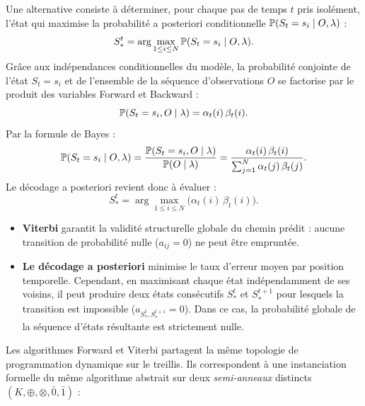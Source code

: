 \begin{proposition}
    Une alternative consiste à déterminer, pour chaque pas de temps $t$ pris isolément, l'état qui maximise la probabilité a posteriori conditionnelle $\mathbb{P}(S_t = s_i \mid O, \lambda)$ :
    \begin{equation}
        S_*^t = \arg\max_{1 \le i \le N} \mathbb{P}(S_t = s_i \mid O, \lambda).
    \end{equation}
    Grâce aux indépendances conditionnelles du modèle, la probabilité conjointe de l'état $S_t = s_i$ et de l'ensemble de la séquence d'observations $O$ se factorise par le produit des variables Forward et Backward :
    \begin{equation}
        \mathbb{P}(S_t = s_i, O \mid \lambda) = \alpha_t(i) \, \beta_t(i).
    \end{equation}
    Par la formule de Bayes :
    \begin{equation}
        \mathbb{P}(S_t = s_i \mid O, \lambda) = \frac{\mathbb{P}(S_t = s_i, O \mid \lambda)}{\mathbb{P}(O \mid \lambda)} = \frac{\alpha_t(i) \, \beta_t(i)}{\sum_{j=1}^N \alpha_t(j) \, \beta_t(j)}.
    \end{equation}
    Le décodage a posteriori revient donc à évaluer :
    \begin{equation}
        S_*^t = \arg\max_{1 \le i \le N} \big( \alpha_t(i) \, \beta_t(i) \big).
    \end{equation}
\end{proposition}

\begin{remark}
    \begin{itemize}
        \item \textbf{Viterbi} garantit la validité structurelle globale du chemin prédit : aucune transition de probabilité nulle ($a_{ij} = 0$) ne peut être empruntée.
        \item \textbf{Le décodage a posteriori} minimise le taux d'erreur moyen par position temporelle. Cependant, en maximisant chaque état indépendamment de ses voisins, il peut produire deux états consécutifs $S_*^t$ et $S_*^{t+1}$ pour lesquels la transition est impossible ($a_{S_*^t, S_*^{t+1}} = 0$). Dans ce cas, la probabilité globale de la séquence d'états résultante est strictement nulle.
    \end{itemize}
\end{remark}

Les algorithmes Forward et Viterbi partagent la même topologie de programmation dynamique sur le treillis. Ils correspondent à une instanciation formelle du même algorithme abstrait sur deux \emph{semi-anneaux} distincts $(K, \oplus, \otimes, \bar{0}, \bar{1})$ :

